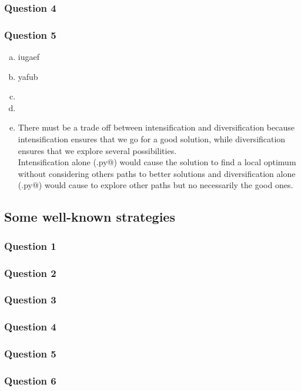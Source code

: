 \documentclass[a4paper,10pt]{article}
\begin{document}
\subsubsection{Question 4}
\subsubsection{Question 5}
	\begin{enumerate}[(a)]
		\item iugaef
		\item yafub
		\item
		\item 
		\item There must be a trade off between intensification and diversification because intensification ensures that we go for a good solution, while diversification ensures that we explore several possibilities. \\
		Intensification alone (\verb@maxvalue.py@) would cause the solution to find a local optimum without considering others paths to better solutions and diversification alone (\verb@randomwalk.py@) would cause to explore other paths but no necessarily the good ones.
	\end{enumerate}

\subsection{Some well-known strategies}
\subsubsection{Question 1}
\subsubsection{Question 2}
\subsubsection{Question 3}
\subsubsection{Question 4}
\subsubsection{Question 5}
\subsubsection{Question 6}
\end{document}
